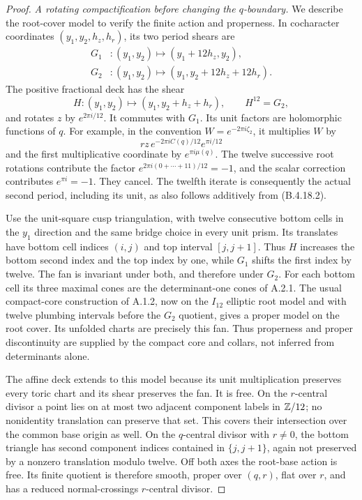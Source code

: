 \begin{proof}
\emph{A rotating compactification before changing the
$q$-boundary.}
We describe the root-cover model to verify the finite
action and properness. In cocharacter coordinates
$(y_1,y_2,h_z,h_r)$, its two period shears are
\[
 \begin{aligned}
 G_1 &: (y_1,y_2)\longmapsto(y_1+12h_z,y_2),\\
 G_2 &: (y_1,y_2)\longmapsto
                         (y_1,y_2+12h_z+12h_r).
 \end{aligned}
\]
The positive fractional deck has the shear
\[
 H:(y_1,y_2)\longmapsto(y_1,y_2+h_z+h_r),
 \qquad H^{12}=G_2,
 \tag{B.4.18.5}
\]
and rotates $z$ by $e^{2\pi i/12}$.
It commutes with $G_1$. Its unit factors are holomorphic
functions of $q$. For example, in the convention
$W=e^{-2\pi i\zeta_2}$, it multiplies $W$ by
\[
 r z\,e^{-2\pi i C(q)/12}e^{\pi i/12}
\]
and the first multiplicative coordinate by
$e^{\pi i\mu(q)}$. The twelve successive root rotations
contribute the factor
$e^{2\pi i(0+\cdots+11)/12}=-1$, and the scalar
correction contributes $e^{\pi i}=-1$.
They cancel. The twelfth iterate is consequently
the actual second period, including its unit, as
also follows additively from (B.4.18.2).

Use the unit-square cusp triangulation, with twelve
consecutive bottom cells in the $y_1$ direction and
the same bridge choice in every unit prism. Its
translates have bottom cell indices $(i,j)$ and top
interval $[j,j+1]$. Thus $H$ increases the bottom
second index and the top index by one, while $G_1$
shifts the first index by twelve. The fan is invariant
under both, and therefore under $G_2$.
For each bottom cell its three maximal cones are
the determinant-one cones of A.2.1. The usual
compact-core construction of A.1.2, now on the
$I_{12}$ elliptic root model and with twelve
plumbing intervals before the $G_2$ quotient,
gives a proper model on the root cover. Its
unfolded charts are precisely this fan. Thus
properness and proper discontinuity are supplied
by the compact core and collars, not inferred
from determinants alone.

The affine deck extends to this model because its
unit multiplication preserves every toric chart
and its shear preserves the fan. It is free.
On the $r$-central divisor a point lies on at most
two adjacent component labels in $\mathbb Z/12$; no
nonidentity translation can preserve that set.
This covers their intersection over the common
base origin as well. On the $q$-central divisor
with $r\ne0$, the bottom triangle has second
component indices contained in $\{j,j+1\}$,
again not preserved by a nonzero translation
modulo twelve. Off both axes the root-base action
is free. Its finite quotient is therefore smooth,
proper over $(q,r)$, flat over $r$, and has a
reduced normal-crossings $r$-central divisor.


\end{proof}
